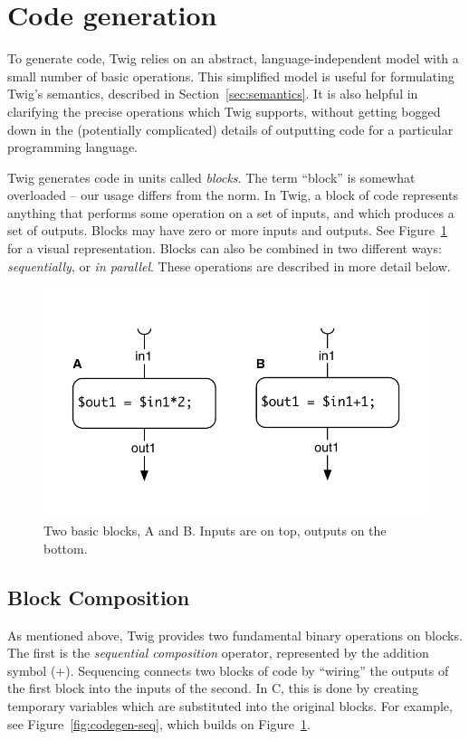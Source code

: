 
\section{Code generation}
\label{sec:code-gen}

To generate code, Twig relies on an abstract, language-independent model with a
small number of basic operations. This simplified model is useful for
formulating Twig's semantics, described in Section~\ref{sec:semantics}. It is
also helpful in clarifying the precise operations which Twig supports, without
getting bogged down in the (potentially complicated) details of outputting code
for a particular programming language.

Twig generates code in units called \emph{blocks}. The term ``block'' is
somewhat overloaded -- our usage differs from the norm. In Twig, a block of code
represents anything that performs some operation on a set of inputs, and which
produces a set of outputs. Blocks may have zero or more inputs and outputs. See
Figure~\ref{fig:blocks} for a visual representation. Blocks can also be combined
in two different ways: \emph{sequentially}, or \emph{in parallel}. These
operations are described in more detail below.

\begin{figure}[ht]
\centering
\includegraphics[width=0.75\columnwidth]{images/code-gen1}
\caption{Two basic blocks, A and B. Inputs are on top, outputs on the bottom.}
\label{fig:blocks}
\end{figure}

\subsection{Block Composition}

As mentioned above, Twig provides two fundamental binary operations on blocks.
The first is the \emph{sequential composition} operator, represented by the
addition symbol ($+$). Sequencing connects two blocks of code by ``wiring'' the
outputs of the first block into the inputs of the second. In C, this is done by
creating temporary variables which are substituted into the original blocks. For
example, see Figure~\ref{fig:codegen-seq}, which builds on
Figure~\ref{fig:blocks}.

